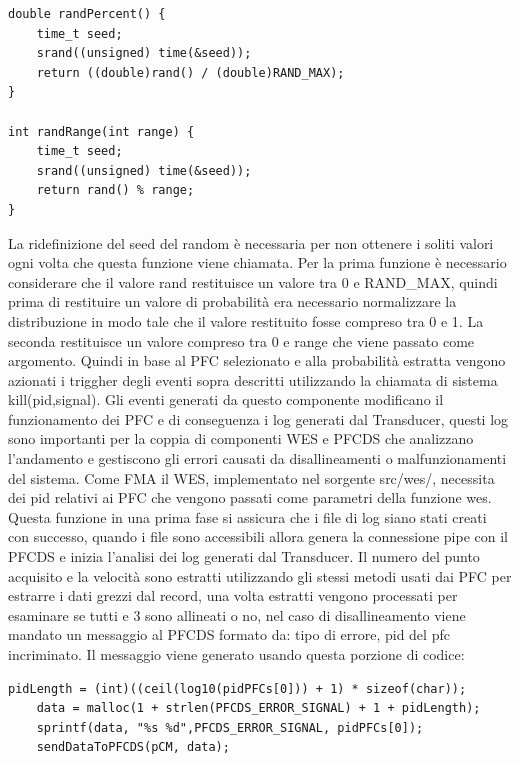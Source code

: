 \documentclass{article}
\begin{document}
\begin{flushleft}
\begin{lstlisting}[frame=single]
double randPercent() {
    time_t seed;
    srand((unsigned) time(&seed));
    return ((double)rand() / (double)RAND_MAX);
}

int randRange(int range) {
    time_t seed;
    srand((unsigned) time(&seed));
    return rand() % range;
}
\end{lstlisting}

La ridefinizione del seed del random è necessaria per non ottenere i soliti valori ogni volta che questa funzione viene chiamata. Per la prima funzione è necessario considerare che il valore rand restituisce un valore tra 0 e RAND\_MAX, quindi prima di restituire un valore di probabilità era necessario normalizzare la distribuzione in modo tale che il valore restituito fosse compreso tra 0 e 1. La seconda restituisce un valore compreso tra 0 e range che viene passato come argomento. Quindi in base al PFC selezionato e alla probabilità estratta vengono azionati i triggher degli eventi sopra descritti utilizzando la chiamata di sistema kill(pid,signal). Gli eventi generati da questo componente modificano il funzionamento dei PFC e di conseguenza i log generati dal Transducer, questi log sono importanti per la coppia di componenti WES e PFCDS che analizzano l'andamento e gestiscono gli errori causati da disallineamenti o malfunzionamenti del sistema. Come FMA il WES, implementato nel sorgente src/wes/, necessita dei pid relativi ai PFC che vengono passati come parametri della funzione wes. Questa funzione in una prima fase si assicura che i file di log siano stati creati con successo, quando i file sono accessibili allora genera la connessione pipe con il PFCDS e inizia l'analisi dei log generati dal Transducer. Il numero del punto acquisito e la velocità sono estratti utilizzando gli stessi metodi usati dai PFC per estrarre i dati grezzi dal record, una volta estratti vengono processati per esaminare se tutti e 3 sono allineati o no, nel caso di disallineamento viene mandato un messaggio al PFCDS formato da: tipo di errore, pid del pfc incriminato. Il messaggio viene generato usando questa porzione di codice:

\begin{lstlisting}[frame=single]
    pidLength = (int)((ceil(log10(pidPFCs[0])) + 1) * sizeof(char));
    data = malloc(1 + strlen(PFCDS_ERROR_SIGNAL) + 1 + pidLength);
    sprintf(data, "%s %d",PFCDS_ERROR_SIGNAL, pidPFCs[0]);
    sendDataToPFCDS(pCM, data);
\end{lstlisting}


\end{flushleft}
\end{document}
